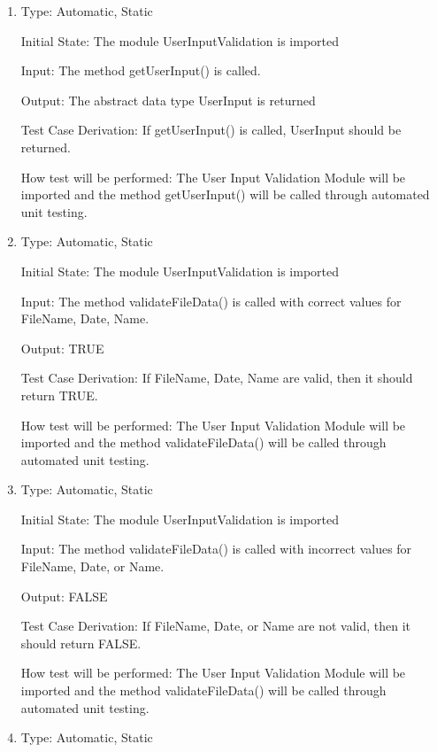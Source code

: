 \documentclass[12pt, titlepage]{article}
\begin{document}
  \begin{enumerate}[{UT-UI}1.]

  \item
  
  Type: Automatic, Static 

  Initial State: The module UserInputValidation is imported

  Input: The method getUserInput() is called.

  Output: The abstract data type UserInput is returned

  Test Case Derivation: If getUserInput() is called,  UserInput should be returned.

  How test will be performed: The User Input Validation Module will be imported and the method getUserInput() will be called through automated unit testing. 

  \item
  
  Type: Automatic, Static 

  Initial State: The module UserInputValidation is imported

  Input: The method validateFileData() is called with correct values for FileName, Date, Name.

  Output: TRUE

  Test Case Derivation: If FileName, Date, Name are valid, then it should return TRUE.

  How test will be performed: The User Input Validation Module will be imported and the method validateFileData() will be called through automated unit testing. 

  \item
  
  Type: Automatic, Static 

  Initial State: The module UserInputValidation is imported

  Input: The method validateFileData() is called with incorrect values for FileName, Date, or Name.

  Output: FALSE

  Test Case Derivation: If FileName, Date, or Name are not valid, then it should return FALSE.

  How test will be performed: The User Input Validation Module will be imported and the method validateFileData() will be called through automated unit testing. 

  \item
  
  Type: Automatic, Static 


\end{enumerate}
\end{document}
